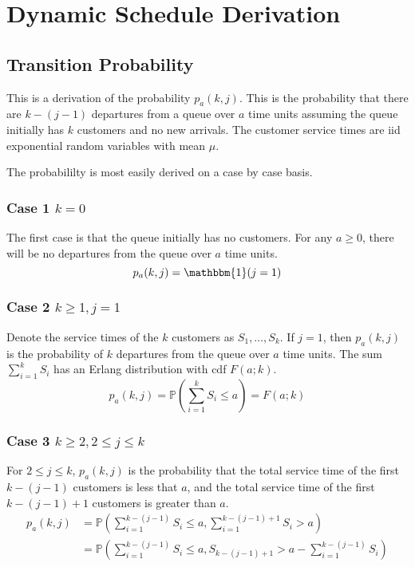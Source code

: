 \chapter{Dynamic Schedule Derivation}

\section{Transition Probability}
This is a derivation of the probability $p_{a} (k, j)$. This is the probability that there are $k - (j - 1)$ departures from a queue over $a$ time units assuming the queue initially has $k$ customers and no new arrivals. The customer service times are iid exponential random variables with mean $\mu$.

The probabililty is most easily derived on a case by case basis.

\subsection{Case 1 $k = 0$}
The first case is that the queue initially has no customers. For any $a \geq 0$, there will be no departures from the queue over $a$ time units.
\begin{equation}
	p_{a} (k, j) = \mathbbm{1} (j = 1)
\end{equation}

\subsection{Case 2 $k \geq 1, j = 1$}
Denote the service times of the $k$ customers as $S_{1}, \ldots, S_{k}$. If $j = 1$, then $p_{a} (k, j)$ is the probability of $k$ departures from the queue over $a$ time units. The sum $\sum_{i = 1}^{k} S_{i}$ has an Erlang distribution with cdf $F (a; k)$.
\begin{equation}
	p_{a} (k, j) = \mathbb{P} \left( \sum_{i = 1}^{k} S_{i} \leq a \right) = F (a; k)
\end{equation}

\subsection{Case 3 $k \geq 2, 2 \leq j \leq k$}
For $2 \leq j \leq k$, $p_{a} (k, j)$ is the probability that the total service time of the first $k - (j - 1)$ customers is less that $a$, and the total service time of the first $k - (j - 1) + 1$ customers is greater than $a$.
\begin{equation}
	\begin{split}
		p_{a} (k, j)
		& = \mathbb{P} \left( \sum_{i = 1}^{k - (j - 1)} S_{i} \leq a, \sum_{i = 1}^{k - (j - 1) + 1} S_{i} > a \right) \\
		& = \mathbb{P} \left( \sum_{i = 1}^{k - (j - 1)} S_{i} \leq a, S_{k - (j - 1) + 1} > a - \sum_{i = 1}^{k - (j - 1)} S_{i} \right) \\
	\end{split}
\end{equation}

